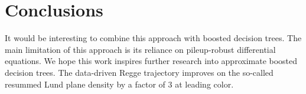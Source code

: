\section{Conclusions}\label{sec:conclusions}

It would be interesting to combine this approach with boosted decision
trees. The main limitation of this approach is its reliance on
pileup-robust differential equations. We hope this work inspires further
research into approximate boosted decision trees. The data-driven Regge
trajectory improves on the so-called resummed Lund plane density by a
factor of 3 at leading color.

